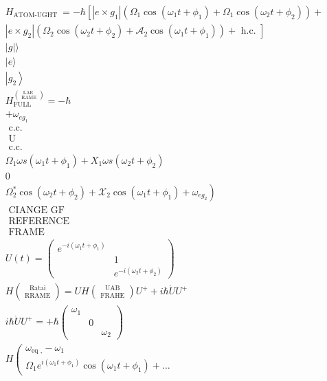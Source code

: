 $$
\begin{aligned}
& H_{\text {ATOM-UGHT }}=-\hbar\left[\left|e \times g_{1}\right|\left(\Omega_{1} \cos \left(\omega_{1} t+\phi_{1}\right)+\Omega_{1} \cos \left(\omega_{2} t+\phi_{2}\right)\right)+\right. \\
& \left.\left|e \times g_{2}\right|\left(\Omega_{2} \cos \left(\omega_{2} t+\phi_{2}\right)+\mathscr{A}_{2} \cos \left(\omega_{1} t+\phi_{1}\right)\right)+\text { h.c. }\right] \\
& |g|\rangle \\
& |e\rangle \\
& \left|g_{2}\right\rangle \\
& H_{\text {FULL }}^{\binom{\text {LAE }}{\text { RAME }}}=-\hbar \\
& +\omega_{e g_{1}} \\
& \text { c.c. } \\
& \text { U } \\
& \text { c.c. } \\
& \Omega_{1} \omega s\left(\omega_{1} t+\phi_{1}\right)+X_{1} \omega s\left(\omega_{2} t+\phi_{2}\right) \\
& 0 \\
& \left.\Omega_{2}^{*} \cos \left(\omega_{2} t+\phi_{2}\right)+\mathscr{X}_{2} \cos \left(\omega_{1} t+\phi_{1}\right)+\omega_{e g_{2}}\right) \\
& \text { CIANGE GF } \\
& \text { REFERENCE } \\
& \text { FRAME } \\
& U(t)=\left(\begin{array}{cc}
e^{-i\left(\omega_{1} t+\phi_{1}\right)} & \\
& 1 \\
& e^{-i\left(\omega_{2} t+\phi_{2}\right)}
\end{array}\right) \\
& H\binom{\text { Ratai }}{\text { RRAME }}=U H\binom{\text { UAB }}{\text { FRAHE }} U^{+}+i \hbar \dot{U} U^{+} \\
& i \hbar \dot{U} U^{+}=+\hbar\left(\begin{array}{ccc}
\omega_{1} & & \\
& 0 & \\
& & \omega_{2}
\end{array}\right) \\
& H\left(\begin{array}{c}
\omega_{\text {eq },}-\omega_{1} \\
\Omega_{1} e^{i\left(\omega_{1} t+\phi_{1}\right)} \cos \left(\omega_{1} t+\phi_{1}\right)+\ldots

\end{array}
\end{aligned}$$
